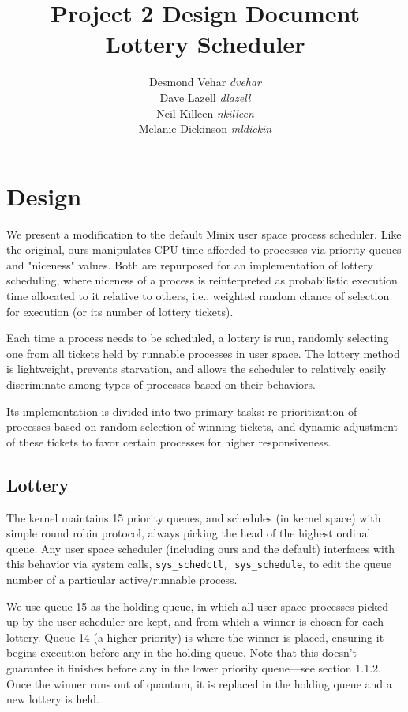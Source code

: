 \documentclass[10pt]{article}
\begin{document}
\title{\textbf{Project 2 Design Document} \\
Lottery Scheduler}
\author{
Desmond Vehar \textit{dvehar} \\
Dave Lazell \textit{dlazell} \\
Neil Killeen \textit{nkilleen} \\
Melanie Dickinson \textit{mldickin} } 
\maketitle 

\section{Design}
We present a modification to the default Minix user space process scheduler. Like the original, ours manipulates CPU time afforded to processes via priority queues and "niceness" values. Both are repurposed for an implementation of lottery scheduling, where niceness of a process is reinterpreted as probabilistic execution time allocated to it relative to others, i.e., weighted random chance of selection for execution (or its number of lottery tickets). 

Each time a process needs to be scheduled, a lottery is run, randomly selecting one from all tickets held by runnable processes in user space. The lottery method is lightweight, prevents starvation, and allows the scheduler to relatively easily discriminate among types of processes based on their behaviors.

Its implementation is divided into two primary tasks: re-prioritization of processes based on random selection of winning tickets, and dynamic adjustment of these tickets to favor certain processes for higher responsiveness. 

\subsection{Lottery}
The kernel maintains 15 priority queues, and schedules (in kernel space) with simple round robin protocol, always picking the head of the highest ordinal queue. Any user space scheduler (including ours and the default) interfaces with this behavior via system calls, \lstinline{sys_schedctl, sys_schedule}, to edit the queue number of a particular active/runnable process. 

We use queue 15 as the holding queue, in which all user space processes picked up by the user scheduler are kept, and from which a winner is chosen for each lottery. Queue 14 (a higher priority) is where the winner is placed, ensuring it begins execution before any in the holding queue. Note that this doesn't guarantee it finishes before any in the lower priority queue---see section 1.1.2. Once the winner runs out of quantum, it is replaced in the holding queue and a new lottery is held.
\end{document}
